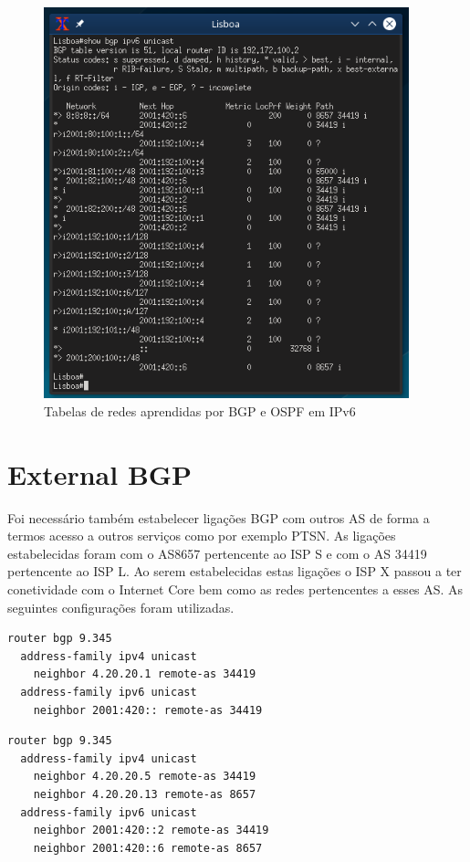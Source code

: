 \documentclass[11pt,a4paper]{report}
\begin{document}
\begin{figure}[H]
\centerline{\includegraphics[width=300pt]{lisboa_bgp_ipv6.png}}
\caption{Tabelas de redes aprendidas por BGP e OSPF em IPv6}
\label{schema}
\end{figure}

\section{External BGP}
Foi necessário também estabelecer ligações BGP com outros AS de forma a termos acesso a outros serviços como por exemplo PTSN. As ligações estabelecidas foram com o AS8657 pertencente ao ISP S e com o AS 34419 pertencente ao ISP L. Ao serem estabelecidas estas ligações o ISP X passou a ter conetividade com o Internet Core bem como as redes pertencentes a esses AS. As seguintes configurações foram utilizadas.

\begin{lstlisting}[caption=External BGP - Router Porto]
router bgp 9.345
  address-family ipv4 unicast
  	neighbor 4.20.20.1 remote-as 34419
  address-family ipv6 unicast
  	neighbor 2001:420:: remote-as 34419
\end{lstlisting}

\begin{lstlisting}[caption=External BGP - Router Lisboa]
router bgp 9.345
  address-family ipv4 unicast
  	neighbor 4.20.20.5 remote-as 34419
	neighbor 4.20.20.13 remote-as 8657
  address-family ipv6 unicast
  	neighbor 2001:420::2 remote-as 34419
 	neighbor 2001:420::6 remote-as 8657
\end{lstlisting}
\end{document}
